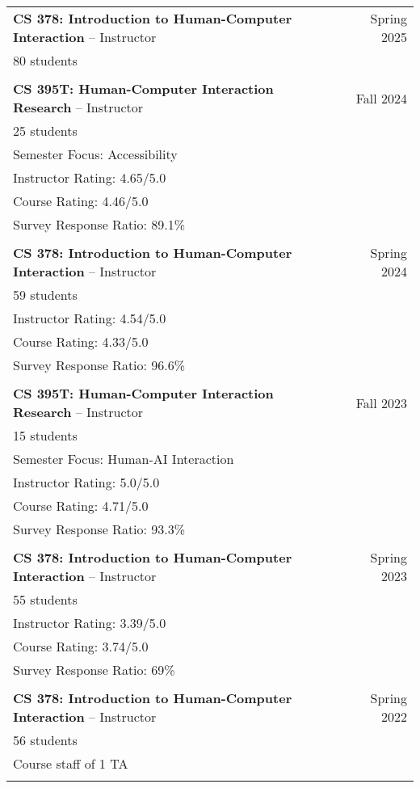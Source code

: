 \begin{longtable}{Xr}
	\textbf{CS 378: Introduction to Human-Computer Interaction} -- Instructor & Spring 2025 \\
	80 students &  \\
	\\

	\textbf{CS 395T: Human-Computer Interaction Research} -- Instructor & Fall 2024 \\
	25 students &  \\
	Semester Focus: Accessibility &  \\
	Instructor Rating: 4.65/5.0 &  \\
	Course Rating: 4.46/5.0 &  \\
	Survey Response Ratio: 89.1\% &  \\
	\\

	\textbf{CS 378: Introduction to Human-Computer Interaction} -- Instructor & Spring 2024 \\
	59 students &  \\
	Instructor Rating: 4.54/5.0 &  \\
	Course Rating: 4.33/5.0 &  \\
	Survey Response Ratio: 96.6\% &  \\
	\\

	\textbf{CS 395T: Human-Computer Interaction Research} -- Instructor & Fall 2023 \\
	15 students &  \\
	Semester Focus: Human-AI Interaction &  \\
	Instructor Rating: 5.0/5.0 &  \\
	Course Rating: 4.71/5.0 &  \\
	Survey Response Ratio: 93.3\% &  \\
	\\

	\textbf{CS 378: Introduction to Human-Computer Interaction} -- Instructor & Spring 2023 \\
	55 students &  \\
	Instructor Rating: 3.39/5.0 &  \\
	Course Rating: 3.74/5.0 &  \\
	Survey Response Ratio: 69\% &  \\
	\\

	\textbf{CS 378: Introduction to Human-Computer Interaction} -- Instructor & Spring 2022 \\
	56 students &  \\
	Course staff of 1 TA &  \\
	\\


\end{longtable}
